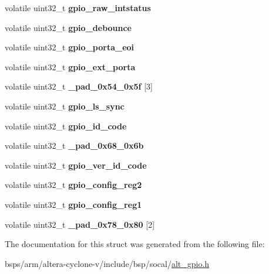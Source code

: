 \begin{DoxyCompactItemize}
\item 
\mbox{\label{structALT__GPIO__raw__s_ae8077088e11cab2273fe97e7a5388a3c}} 
volatile uint32\+\_\+t {\bfseries gpio\+\_\+raw\+\_\+intstatus}
\item 
\mbox{\label{structALT__GPIO__raw__s_ab41c709bcb48be0ba19105a92688697c}} 
volatile uint32\+\_\+t {\bfseries gpio\+\_\+debounce}
\item 
\mbox{\label{structALT__GPIO__raw__s_acd02452591e245997b29b6517fb01190}} 
volatile uint32\+\_\+t {\bfseries gpio\+\_\+porta\+\_\+eoi}
\item 
\mbox{\label{structALT__GPIO__raw__s_a934967d23f3f9fd291d3e2206b613f63}} 
volatile uint32\+\_\+t {\bfseries gpio\+\_\+ext\+\_\+porta}
\item 
\mbox{\label{structALT__GPIO__raw__s_a740ada3ff80cf88b222fa14bea442cd2}} 
volatile uint32\+\_\+t {\bfseries \+\_\+pad\+\_\+0x54\+\_\+0x5f} \mbox{[}3\mbox{]}
\item 
\mbox{\label{structALT__GPIO__raw__s_a3977cd78de659a0b2966bcd58ecc4ef1}} 
volatile uint32\+\_\+t {\bfseries gpio\+\_\+ls\+\_\+sync}
\item 
\mbox{\label{structALT__GPIO__raw__s_ae05cb972b3eecae6d8f9109b392e289f}} 
volatile uint32\+\_\+t {\bfseries gpio\+\_\+id\+\_\+code}
\item 
\mbox{\label{structALT__GPIO__raw__s_a2a678b28d71679a96c6bfec89d412e70}} 
volatile uint32\+\_\+t {\bfseries \+\_\+pad\+\_\+0x68\+\_\+0x6b}
\item 
\mbox{\label{structALT__GPIO__raw__s_ae408d15c3c09fc234f7b87ac2a36a52f}} 
volatile uint32\+\_\+t {\bfseries gpio\+\_\+ver\+\_\+id\+\_\+code}
\item 
\mbox{\label{structALT__GPIO__raw__s_a18af0c9da79b25f847b936b9433c70db}} 
volatile uint32\+\_\+t {\bfseries gpio\+\_\+config\+\_\+reg2}
\item 
\mbox{\label{structALT__GPIO__raw__s_aade368d8b3096e6b05bf85d7d6165262}} 
volatile uint32\+\_\+t {\bfseries gpio\+\_\+config\+\_\+reg1}
\item 
\mbox{\label{structALT__GPIO__raw__s_a83838877dd01b11d25c942ff7d0bc262}} 
volatile uint32\+\_\+t {\bfseries \+\_\+pad\+\_\+0x78\+\_\+0x80} \mbox{[}2\mbox{]}
\end{DoxyCompactItemize}


The documentation for this struct was generated from the following file\+:\begin{DoxyCompactItemize}
\item 
bsps/arm/altera-\/cyclone-\/v/include/bsp/socal/\mbox{\hyperlink{alt__gpio_8h}{alt\+\_\+gpio.\+h}}\end{DoxyCompactItemize}
